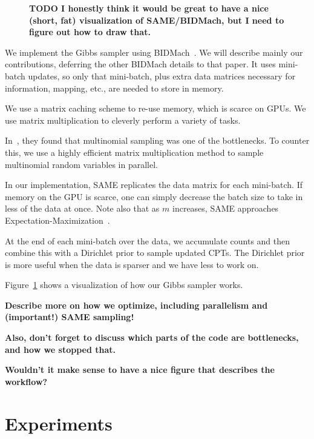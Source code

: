 \documentclass{article} %
\begin{document}
\begin{figure}[t]
\begin{center}
\fbox{\rule[-.5cm]{0cm}{4cm} \rule[-.5cm]{4cm}{0cm}}
\end{center}
\caption{\textbf{TODO I honestly think it would be great to have a nice (short, fat) visualization
of SAME/BIDMach, but I need to figure out how to draw that.}}
\label{fig:BIDMach}
\end{figure}

We implement the Gibbs sampler using BIDMach~\citep{bidmach}. We will describe mainly our
contributions, deferring the other BIDMach details to that paper. It uses mini-batch updates, so
only that mini-batch, plus extra data matrices necessary for information, mapping, etc., are needed
to store in memory.

We use a matrix caching scheme to re-use memory, which is scarce on GPUs. We use matrix
multiplication to cleverly perform a variety of tasks.

In~\citep{SAME2015}, they found that multinomial sampling was one of the bottlenecks. To counter
this, we use a highly efficient matrix multiplication method to sample multinomial random variables
in parallel.

In our implementation, SAME replicates the data matrix for each mini-batch. If memory on the GPU is
scarce, one can simply decrease the batch size to take in less of the data at once. Note also that
as $m$ increases, SAME approaches Expectation-Maximization~\citep{EMpaper}.

At the end of each mini-batch over the data, we accumulate counts and then combine this with a
Dirichlet prior to sample updated CPTs. The Dirichlet prior is more useful when the data is sparser
and we have less to work on.

Figure~\ref{fig:BIDMach} shows a visualization of how our Gibbs sampler works.

\textbf{Describe more on how we optimize, including parallelism and (important!) SAME sampling!}

\textbf{Also, don't forget to discuss which parts of the code are bottlenecks, and how we stopped
that.}

\textbf{Wouldn't it make sense to have a nice figure that describes the workflow?}



\section{Experiments}\label{sec:experiments}
\end{document}
